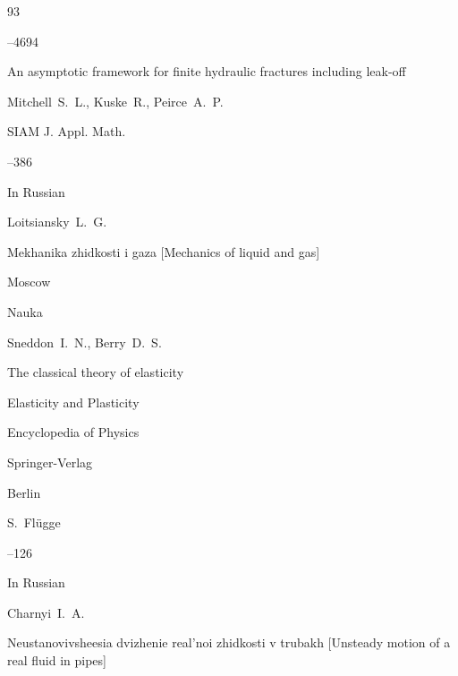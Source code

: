 \begin{thebibliography}{93}



–4694





\paper An asymptotic framework for finite hydraulic fractures including leak-off

\by   Mitchell~S.~L.,  Kuske~R., Peirce~A.~P.

\jour SIAM J. Appl. Math.




–386





\lang In Russian

\by Loitsiansky~L.~G.

\book Mekhanika zhidkosti i gaza \rm [Mechanics of liquid and gas]

\publaddr Moscow

\publ Nauka






\by Sneddon~I.~N.,  Berry~D.~S.

\paper The classical theory of elasticity

\inbook Elasticity and Plasticity

\serial Encyclopedia of Physics 

\publ Springer-Verlag

\publaddr Berlin

\ed S.~Fl\"ugge 



–126







\lang In Russian

\by Charnyi~I.~A.

\book Neustanovivsheesia dvizhenie real'noi zhidkosti v trubakh \rm [Unsteady motion of a real fluid in pipes]


\end{thebibliography}

